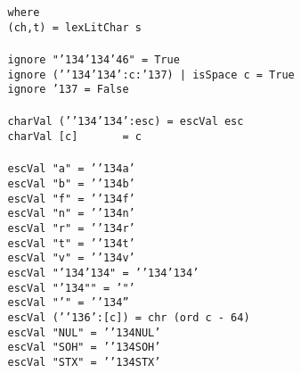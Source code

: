 \mbox{\tt \ \ \ \ \ \ \ \ \ \ \ \ \ \ \ \ where}\\
\mbox{\tt \ \ \ \ \ \ \ \ \ \ \ \ \ \ \ \ (ch,t)\ =\ lexLitChar\ s}\\
\mbox{\tt }\\
\mbox{\tt \ \ \ \ \ \ \ \ \ \ \ \ \ \ \ \ ignore\ "{\char'134}{\char'134}{\char'46}"\ =\ True}\\
\mbox{\tt \ \ \ \ \ \ \ \ \ \ \ \ \ \ \ \ ignore\ ('{\char'134}{\char'134}':c:{\char'137})\ |\ isSpace\ c\ =\ True}\\
\mbox{\tt \ \ \ \ \ \ \ \ \ \ \ \ \ \ \ \ ignore\ {\char'137}\ =\ False}\\
\mbox{\tt }\\
\mbox{\tt \ \ \ \ \ \ \ \ \ \ \ \ \ \ \ \ charVal\ ('{\char'134}{\char'134}':esc)\ =\ escVal\ esc}\\
\mbox{\tt \ \ \ \ \ \ \ \ \ \ \ \ \ \ \ \ charVal\ [c]\ \ \ \ \ \ \ =\ c}\\
\mbox{\tt }\\
\mbox{\tt \ \ \ \ \ \ \ \ \ \ \ \ \ \ \ \ escVal\ "a"\ =\ '{\char'134}a'}\\
\mbox{\tt \ \ \ \ \ \ \ \ \ \ \ \ \ \ \ \ escVal\ "b"\ =\ '{\char'134}b'}\\
\mbox{\tt \ \ \ \ \ \ \ \ \ \ \ \ \ \ \ \ escVal\ "f"\ =\ '{\char'134}f'}\\
\mbox{\tt \ \ \ \ \ \ \ \ \ \ \ \ \ \ \ \ escVal\ "n"\ =\ '{\char'134}n'}\\
\mbox{\tt \ \ \ \ \ \ \ \ \ \ \ \ \ \ \ \ escVal\ "r"\ =\ '{\char'134}r'}\\
\mbox{\tt \ \ \ \ \ \ \ \ \ \ \ \ \ \ \ \ escVal\ "t"\ =\ '{\char'134}t'}\\
\mbox{\tt \ \ \ \ \ \ \ \ \ \ \ \ \ \ \ \ escVal\ "v"\ =\ '{\char'134}v'}\\
\mbox{\tt \ \ \ \ \ \ \ \ \ \ \ \ \ \ \ \ escVal\ "{\char'134}{\char'134}"\ =\ '{\char'134}{\char'134}'}\\
\mbox{\tt \ \ \ \ \ \ \ \ \ \ \ \ \ \ \ \ escVal\ "{\char'134}""\ =\ '"'}\\
\mbox{\tt \ \ \ \ \ \ \ \ \ \ \ \ \ \ \ \ escVal\ "'"\ =\ '{\char'134}''}\\
\mbox{\tt \ \ \ \ \ \ \ \ \ \ \ \ \ \ \ \ escVal\ ('{\char'136}':[c])\ =\ chr\ (ord\ c\ -\ 64)}\\
\mbox{\tt \ \ \ \ \ \ \ \ \ \ \ \ \ \ \ \ escVal\ "NUL"\ =\ '{\char'134}NUL'}\\
\mbox{\tt \ \ \ \ \ \ \ \ \ \ \ \ \ \ \ \ escVal\ "SOH"\ =\ '{\char'134}SOH'}\\
\mbox{\tt \ \ \ \ \ \ \ \ \ \ \ \ \ \ \ \ escVal\ "STX"\ =\ '{\char'134}STX'}\\
